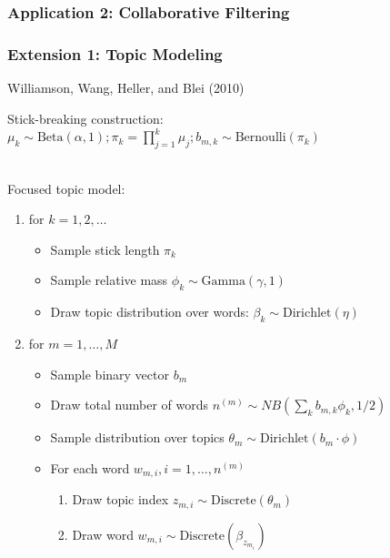 \documentclass[13pt]{beamer}
\begin{document}
\begin{frame}
\frametitle{Application 2: Collaborative Filtering}
\end{frame}
\begin{frame}
\frametitle{Extension 1: Topic Modeling}

\begin{center}
Williamson, Wang, Heller, and Blei (2010)
\end{center}

Stick-breaking construction: $ \mu_k \sim \text{Beta}(\alpha, 1);
\pi_k = \prod_{j=1}^k \mu_j;
b_{m,k} \sim \text{Bernoulli}(\pi_k) $

~\\

Focused topic model:
\begin{enumerate}
\item for $k=1,2,\ldots$
  \begin{itemize}
  \item Sample stick length $\pi_k$
  \item Sample relative mass $\phi_k \sim \text{Gamma}(\gamma, 1)$
  \item Draw topic distribution over words: $\beta_k \sim \text{Dirichlet}(\eta)$
  \end{itemize}
\item for $m=1,\ldots,M$
  \begin{itemize}
  \item Sample binary vector $b_m$
  \item Draw total number of words $n^{(m)} \sim NB(\sum_k b_{m,k} \phi_k, 1/2)$
  \item Sample distribution over topics $\theta_m \sim \text{Dirichlet}(b_m \cdot \phi)$
  \item For each word $w_{m,i}, i=1,\ldots,n^{(m)}$
    \begin{enumerate}
    \item Draw topic index $z_{m,i} \sim \text{Discrete}(\theta_m)$ 
    \item Draw word $w_{m,i} \sim \text{Discrete}(\beta_{z_{m_i}})$
    \end{enumerate}
  \end{itemize}
\end{enumerate}

\end{frame}
\end{document}
